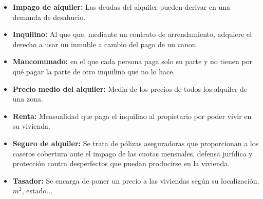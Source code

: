 \begin{itemize}
\item \textbf{Impago de alquiler:} Las deudas del alquiler pueden derivar en una demanda de desahucio.

\item \textbf{Inquilino:} Al que que, mediante un contrato de arrendamiento, adquiere el derecho a usar un inmuble a cambio del pago de un canon.

\item \textbf{Mancomunado:} en el que cada persona paga solo su parte y no tienen por qué pagar la parte de otro inquilino que no lo hace. 

\item \textbf{Precio medio del alquiler:} Media de los precios de todos los alquiler de una zona.

\item \textbf{Renta:} Mensualidad que paga el inquilino al propietario por poder vivir en su vivienda.

\item \textbf{Seguro de alquiler:} Se trata de pólizas aseguradoras que proporcionan a los caseros cobertura ante el impago de las cuotas mensuales, defensa jurídica y protección contra desperfectos que puedan producirse en la vivienda.

\item \textbf{Tasador:} Se encarga de poner un precio a las viviendas según su localización, $ m^2 $, estado...

\end{itemize}